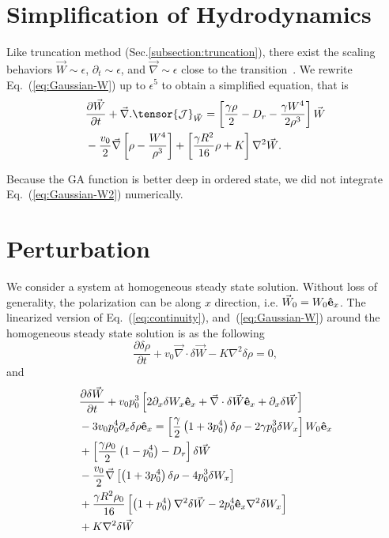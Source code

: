 \documentclass[reprint,floatfix,amsmath,amssymb,aps,pre,showkeys,showpacs,superscriptaddress]{revtex4-1}
\newcommand{\grad}{\vec{\nabla}}
\newcommand{\Dif}[2]{\frac{\partial #1}{\partial #2}}
\newcommand{\p}{p}
\newcommand{\e}{{\bf \hat{e}}}
\newcommand{\w}{W}
\newcommand{\vw}{\vec{\w}}
\newcommand{\hl}[1]{\textcolor{hlcolor}{#1}}
\newcommand{\req}[1]{Eq.~(\ref{#1})}
\newcommand{\reqs}[2]{Eq.~(\ref{#1}), and~(\ref{#2})}
\begin{document}
\appendix

\section{Simplification of Hydrodynamics}
\label{ap:simplification}

Like truncation method (Sec.\ref{subsection:truncation}), there exist the scaling behaviors $\vw \sim \epsilon$, $\partial_t \sim \epsilon$, and $\grad \sim \epsilon$ close to the transition~\cite{Bertin2009}. We rewrite \req{eq:Gaussian-W} up to $\epsilon^5$ to obtain a simplified equation, that is
\begin{equation}
\begin{aligned}
&\Dif{{\vw}}{t} + \grad. \tensor{\mathcal{J}}_{\vw} = \left[ \frac{\gamma \rho}{2} - D_r - \frac{\gamma W^4}{2 \rho^3} \right] \vw \\
&- \frac{v_0}{2} \grad \left[  \rho - \frac{W^4}{\rho^3} \right] + \left[ \frac{\gamma R^2}{16} \rho + K \right] \nabla^2 \vw.
\end{aligned}
\label{eq:Gaussian-W2}
\end{equation}

Because the GA function is better deep in ordered state, we did not integrate \req{eq:Gaussian-W2} numerically. 

\section{Perturbation}
\label{ap:perturbation}

We consider a system at homogeneous steady state solution. Without loss of generality, the polarization can be along $x$ direction, i.e. $\vw_0 = \w_0 \e_x$. The linearized version of \reqs{eq:continuity}{eq:Gaussian-W} around the homogeneous steady state solution  is as the following \hl{
\begin{equation}
\Dif{\delta \rho}{t} + v_0 \grad \cdot \delta \vw - K \nabla^2 \delta \rho = 0,
\label{eq:Gaussian-drho}
\end{equation}
and
\begin{equation}
\begin{aligned}
&\Dif{\delta {\vw}}{t} + v_0 \p_0^3 \left[ 2 \partial_x \delta \w_x \e_x +  \grad \cdot \delta \vw \e_x + \partial_x \delta \vw \right] \\
&- 3 v_0 \p_0^4 \partial_x \delta \rho \e_x = \left[ \frac{\gamma}{2} \left( 1 + 3 \p_0^4 \right) \delta \rho - 2 \gamma \p_0^3 \delta \w_x \right] \w_0 \e_x \\
&+\left[ \frac{\gamma \rho_0}{2} \left( 1 - \p_0^4 \right) - D_r  \right] \delta \vw \\
&- \frac{v_0}{2} \grad \left[ \left( 1 + 3 \p_0^4 \right) \delta \rho - 4 \p_0^3 \delta \w_x \right] \\
&+ \frac{\gamma R^2 \rho_0}{16} \left[ \left( 1+\p_0^4 \right) \nabla^2 \delta \vw - 2 \p_0^4 \e_x \nabla^2 \delta \w_x \right] \\
&+ K \nabla^2 \delta \vw
\end{aligned}
\label{eq:Gaussian-dw}
\end{equation}
}
\end{document}
